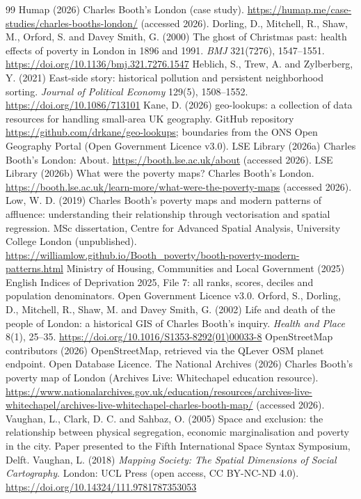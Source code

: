 \documentclass[11pt,a4paper]{article}
\begin{document}

\begin{thebibliography}{99}\small
{} Humap (2026) Charles Booth's London (case study). \url{https://humap.me/case-studies/charles-booths-london/} (accessed 2026).
 Dorling, D., Mitchell, R., Shaw, M., Orford, S. and Davey Smith, G. (2000) The ghost of Christmas past: health effects of poverty in London in 1896 and 1991. \textit{BMJ} 321(7276), 1547--1551. \url{https://doi.org/10.1136/bmj.321.7276.1547}
 Heblich, S., Trew, A. and Zylberberg, Y. (2021) East-side story: historical pollution and persistent neighborhood sorting. \textit{Journal of Political Economy} 129(5), 1508--1552. \url{https://doi.org/10.1086/713101}
 Kane, D. (2026) geo-lookups: a collection of data resources for handling small-area UK geography. GitHub repository \url{https://github.com/drkane/geo-lookups}; boundaries from the ONS Open Geography Portal (Open Government Licence v3.0).
 LSE Library (2026a) Charles Booth's London: About. \url{https://booth.lse.ac.uk/about} (accessed 2026).
 LSE Library (2026b) What were the poverty maps? Charles Booth's London. \url{https://booth.lse.ac.uk/learn-more/what-were-the-poverty-maps} (accessed 2026).
 Low, W. D. (2019) Charles Booth's poverty maps and modern patterns of affluence: understanding their relationship through vectorisation and spatial regression. MSc dissertation, Centre for Advanced Spatial Analysis, University College London (unpublished). \url{https://williamlow.github.io/Booth_poverty/booth-poverty-modern-patterns.html}
 Ministry of Housing, Communities and Local Government (2025) English Indices of Deprivation 2025, File 7: all ranks, scores, deciles and population denominators. Open Government Licence v3.0.
 Orford, S., Dorling, D., Mitchell, R., Shaw, M. and Davey Smith, G. (2002) Life and death of the people of London: a historical GIS of Charles Booth's inquiry. \textit{Health and Place} 8(1), 25--35. \url{https://doi.org/10.1016/S1353-8292(01)00033-8}
 OpenStreetMap contributors (2026) OpenStreetMap, retrieved via the QLever OSM planet endpoint. Open Database Licence.
 The National Archives (2026) Charles Booth's poverty map of London (Archives Live: Whitechapel education resource). \url{https://www.nationalarchives.gov.uk/education/resources/archives-live-whitechapel/archives-live-whitechapel-charles-booth-map/} (accessed 2026).
 Vaughan, L., Clark, D. C. and Sahbaz, O. (2005) Space and exclusion: the relationship between physical segregation, economic marginalisation and poverty in the city. Paper presented to the Fifth International Space Syntax Symposium, Delft.
 Vaughan, L. (2018) \textit{Mapping Society: The Spatial Dimensions of Social Cartography}. London: UCL Press (open access, CC BY-NC-ND 4.0). \url{https://doi.org/10.14324/111.9781787353053}
\end{thebibliography}
\end{document}
